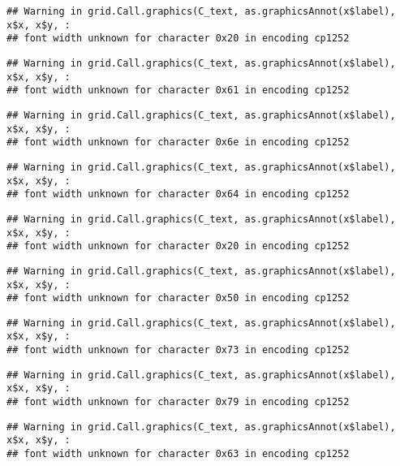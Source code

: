 \documentclass[
]{article}
\begin{document}
\begin{verbatim}
## Warning in grid.Call.graphics(C_text, as.graphicsAnnot(x$label), x$x, x$y, :
## font width unknown for character 0x20 in encoding cp1252
\end{verbatim}

\begin{verbatim}
## Warning in grid.Call.graphics(C_text, as.graphicsAnnot(x$label), x$x, x$y, :
## font width unknown for character 0x61 in encoding cp1252
\end{verbatim}

\begin{verbatim}
## Warning in grid.Call.graphics(C_text, as.graphicsAnnot(x$label), x$x, x$y, :
## font width unknown for character 0x6e in encoding cp1252
\end{verbatim}

\begin{verbatim}
## Warning in grid.Call.graphics(C_text, as.graphicsAnnot(x$label), x$x, x$y, :
## font width unknown for character 0x64 in encoding cp1252
\end{verbatim}

\begin{verbatim}
## Warning in grid.Call.graphics(C_text, as.graphicsAnnot(x$label), x$x, x$y, :
## font width unknown for character 0x20 in encoding cp1252
\end{verbatim}

\begin{verbatim}
## Warning in grid.Call.graphics(C_text, as.graphicsAnnot(x$label), x$x, x$y, :
## font width unknown for character 0x50 in encoding cp1252
\end{verbatim}

\begin{verbatim}
## Warning in grid.Call.graphics(C_text, as.graphicsAnnot(x$label), x$x, x$y, :
## font width unknown for character 0x73 in encoding cp1252
\end{verbatim}

\begin{verbatim}
## Warning in grid.Call.graphics(C_text, as.graphicsAnnot(x$label), x$x, x$y, :
## font width unknown for character 0x79 in encoding cp1252
\end{verbatim}

\begin{verbatim}
## Warning in grid.Call.graphics(C_text, as.graphicsAnnot(x$label), x$x, x$y, :
## font width unknown for character 0x63 in encoding cp1252
\end{verbatim}
\end{document}
